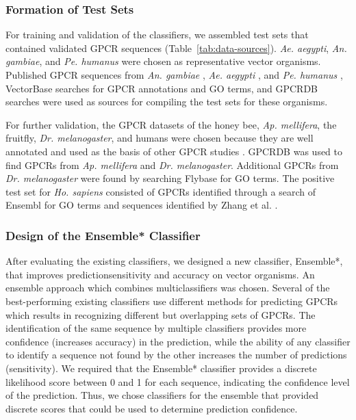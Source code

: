 \subsubsection{Formation of Test Sets}

For training and validation of the classifiers, we assembled test sets that contained validated GPCR sequences (Table~\ref{tab:data-sources}).  \emph{Ae. aegypti}, \emph{An. gambiae}, and \emph{Pe. humanus} were chosen as representative vector organisms.   Published GPCR sequences from \emph{An. gambiae} \cite{Hill2002, Holt2002},  \emph{Ae. aegypti} \cite{Nene2007}, and \emph{Pe. humanus} \cite{Kirkness2010}, VectorBase \cite{Lawson2007, Lawson2009} searches for GPCR annotations and GO terms, and GPCRDB \cite{Horn2003,Vroling2011} searches were used as sources for compiling the test sets for these organisms.

For further validation, the GPCR datasets of the honey bee, \emph{Ap. mellifera}, the fruitfly, \emph{Dr. melanogaster}, and humans were chosen because they are well annotated and used as the basis of other GPCR studies \cite{Bjarnadottir2004, Bjarnadottir2006, Fredriksson2003,Fredriksson2005, Gloriam2005, Haitina2009, Lagerstrom2006, Metpally2005, Metpally2005a, Vassilatis2003, Zhang2002, Zozulya2001}. GPCRDB was used to find GPCRs from \emph{Ap. mellifera} and \emph{Dr. melanogaster}. Additional GPCRs from \emph{Dr. melanogaster} were found by searching Flybase \cite{Adams2000, Gelbart1997, Crosby2007, Tweedie2009, McQuilton2011} for GO terms. The positive test set for \emph{Ho. sapiens} consisted of GPCRs identified through a search of Ensembl \cite{Hubbard2002} for GO terms and sequences identified by Zhang et al. \cite{Zhang2006}.

\subsubsection{Design of the Ensemble* Classifier}
After evaluating the existing classifiers, we designed a new classifier, Ensemble*, that improves predictionsensitivity and accuracy on vector organisms.
An ensemble approach which combines multiclassifiers was chosen.
Several of the best-performing existing classifiers use different methods for predicting GPCRs which results in recognizing different but overlapping sets of GPCRs.
The identification of the same sequence by multiple classifiers provides more confidence (increases accuracy) in the prediction, while the ability of any classifier to identify a sequence not found by the other increases the number of predictions (sensitivity).
We required that the Ensemble* classifier provides a discrete likelihood score between 0 and 1 for each sequence, indicating the confidence level of the prediction.
Thus, we chose classifiers for the ensemble that provided discrete scores that could be used to determine prediction confidence.

